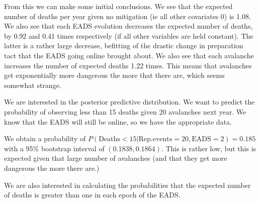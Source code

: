 \documentclass[10pt]{extarticle}
\begin{document}
From this we can make some initial conclusions. We see that the expected number of deaths per year given no mitigation (ie all other covariates 0) is 1.08. We also see that each EADS evolution decreases the expected number of deaths, by 0.92 and 0.41 times respectively (if all other variables are held constant). The latter is a rather large decrease, befitting of the drastic change in preparation tact that the EADS going online brought about. We also see that each avalanche increases the number of expected deaths 1.22 times. This means that avalanches get exponentially more dangerous the more that there are, which seems somewhat strange.

We are interested in the posterior predictive distribution. We want to predict the probability of observing less than 15 deaths given 20 avalanches next year. We know that the EADS will still be online, so we have the appropriate data. 

We obtain a probability of $P(\mathrm{Deaths}<15|\mathrm{Rep.events}=20, \mathrm{EADS}=2) = 0.185$ with a 95\% bootstrap interval of $(0.1838, 0.1864)$. This is rather low, but this is expected given that large number of avalanches (and that they get more dangerous the more there are.)

%

We are also interested in calculating the probabilities that the expected number of deaths is greater than one in each epoch of the EADS. 
\end{document}
